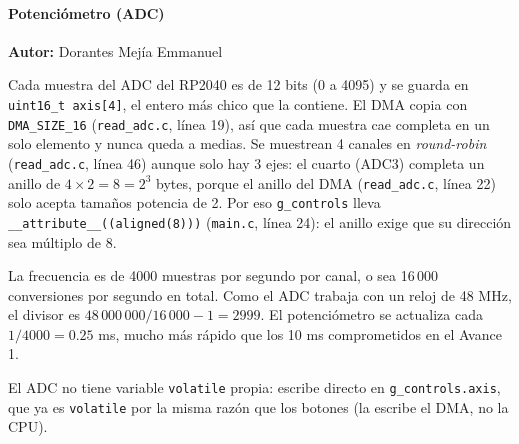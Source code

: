 \paragraph{Potenciómetro (ADC)}
\textbf{Autor:} Dorantes Mejía Emmanuel

Cada muestra del ADC del RP2040 es de 12 bits (0 a 4095) y se guarda en \texttt{uint16\_t axis[4]}, el entero más
chico que la contiene. El DMA copia con \texttt{DMA\_SIZE\_16} (\texttt{read\_adc.c}, línea 19), así que cada muestra
cae completa en un solo elemento y nunca queda a medias. Se muestrean 4 canales en \textit{round-robin}
(\texttt{read\_adc.c}, línea 46) aunque solo hay 3 ejes: el cuarto (ADC3) completa un anillo de
$4 \times 2 = 8 = 2^3$ bytes, porque el anillo del DMA (\texttt{read\_adc.c}, línea 22) solo acepta tamaños
potencia de 2. Por eso \texttt{g\_controls} lleva \texttt{\_\_attribute\_\_((aligned(8)))} (\texttt{main.c}, línea 24):
el anillo exige que su dirección sea múltiplo de 8.

La frecuencia es de 4000 muestras por segundo por canal, o sea 16\,000 conversiones por segundo en total. Como el
ADC trabaja con un reloj de 48 MHz, el divisor es $48\,000\,000 / 16\,000 - 1 = 2999$. El potenciómetro se actualiza
cada $1/4000 = 0.25$ ms, mucho más rápido que los 10 ms comprometidos en el Avance 1.

El ADC no tiene variable \texttt{volatile} propia: escribe directo en \texttt{g\_controls.axis}, que ya es
\texttt{volatile} por la misma razón que los botones (la escribe el DMA, no la CPU).

